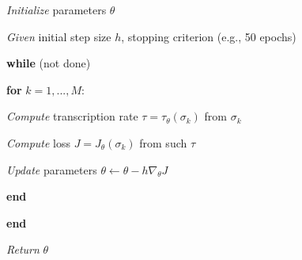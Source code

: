 \documentclass{article}
\begin{document}
\vspace{5mm}

\textit{Initialize} parameters $\theta$

\textit{Given} initial step size $h$, stopping criterion (e.g., 50 epochs)

\textbf{while} (not done) 

\quad \textbf{for} $k = 1, ..., M$:

\qquad \textit{Compute} transcription rate $\tau=\tau_\theta (\sigma_k)$ from $\sigma_k$

\qquad \textit{Compute} loss $J=J_\theta (\sigma_k)$ from such $\tau$

\qquad \textit{Update} parameters $\theta \leftarrow \theta - h \nabla_\theta J $

\quad \textbf{end}

\textbf{end}

\textit{Return} $\theta$

\vspace{5mm}
\end{document}
